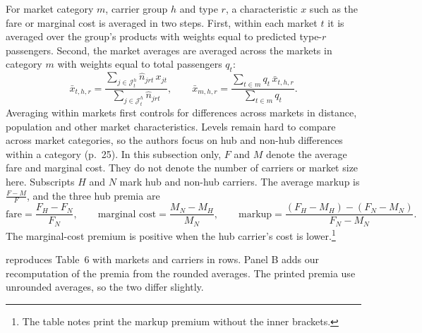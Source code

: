 For market category $m$, carrier group $h$ and type $r$, a characteristic $x$ such as the fare or marginal
cost is averaged in two steps. First, within each market $t$ it is averaged over the group's products with
weights equal to predicted type-$r$ passengers. Second, the market averages are averaged across the markets
in category $m$ with weights equal to total passengers $q_t$:
\begin{equation}\label{eq:09-bcs-avg}
\bar x_{t,h,r}=\frac{\sum_{j\in\mathcal{J}^h_t}\hat n_{jrt}\,x_{jt}}{\sum_{j\in\mathcal{J}^h_t}\hat n_{jrt}},
\qquad
\bar x_{m,h,r}=\frac{\sum_{t\in m}q_t\,\bar x_{t,h,r}}{\sum_{t\in m}q_t}.
\end{equation}
Averaging within markets first controls for differences across markets in distance, population and other
market characteristics. Levels remain hard to compare across market categories, so the authors focus on hub
and non-hub differences within a category (p.~25). In this subsection only, $F$ and $M$ denote the average
fare and marginal cost. They do not denote the number of carriers or market size here. Subscripts $H$ and $N$ mark hub and
non-hub carriers. The average markup is $\frac{F-M}{F}$,
and the three hub premia are
\begin{equation}\label{eq:09-bcs-premia}
\text{fare}=\frac{F_H-F_N}{F_N},\qquad
\text{marginal cost}=\frac{M_N-M_H}{M_N},\qquad
\text{markup}=\frac{(F_H-M_H)-(F_N-M_N)}{F_N-M_N}.
\end{equation}
The marginal-cost premium is positive when the hub carrier's cost is lower.\footnote{The table notes print
the markup premium without the inner brackets.}

 reproduces Table~6 with markets and carriers in rows. Panel B adds our recomputation of
the premia from the rounded averages. The printed premia use unrounded averages, so the two differ slightly.

